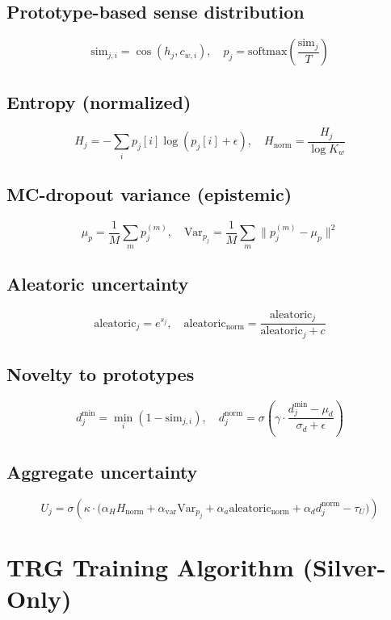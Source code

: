 \documentclass[a4paper,11pt]{article}
\begin{document}
\subsection{Prototype-based sense distribution}
\[
\text{sim}_{j,i} = \cos(h_j, c_{w,i}), \quad
p_j = \text{softmax}\left(\frac{\text{sim}_j}{T}\right)
\]

\subsection{Entropy (normalized)}
\[
H_j = - \sum_i p_j[i] \log(p_j[i] + \epsilon), \quad
H_{\text{norm}} = \frac{H_j}{\log K_w}
\]

\subsection{MC-dropout variance (epistemic)}
\[
\mu_p = \frac{1}{M} \sum_m p_j^{(m)}, \quad
\text{Var}_{p_j} = \frac{1}{M} \sum_m \|p_j^{(m)} - \mu_p\|^2
\]

\subsection{Aleatoric uncertainty}
\[
\text{aleatoric}_j = e^{s_j}, \quad
\text{aleatoric}_{\text{norm}} = \frac{\text{aleatoric}_j}{\text{aleatoric}_j + c}
\]

\subsection{Novelty to prototypes}
\[
d^{\min}_j = \min_i (1 - \text{sim}_{j,i}), \quad
d^{\text{norm}}_j = \sigma\!\left(\gamma \cdot \frac{d^{\min}_j - \mu_d}{\sigma_d + \epsilon}\right)
\]

\subsection{Aggregate uncertainty}
\[
U_j = \sigma\!\left(\kappa \cdot \Big( \alpha_H H_{\text{norm}} +
\alpha_{\text{var}} \text{Var}_{p_j} +
\alpha_a \text{aleatoric}_{\text{norm}} +
\alpha_d d^{\text{norm}}_j - \tau_U \Big)\right)
\]

\section{TRG Training Algorithm (Silver-Only)}
\end{document}
